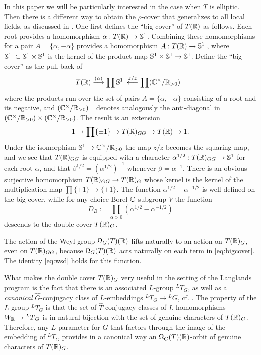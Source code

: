 \documentclass{article}
\theoremstyle{definition}
\numberwithin{equation}{section}
\renewcommand{\-}{\hyp{}}
\begin{document}
In this paper we will be particularly interested in the case when $T$ is elliptic. Then there is a different way to obtain the $\rho$-cover that generalizes to all local fields, as discussed in \cite{KalDC}. One first defines the ``big cover'' of $T(\mathbb{R})$ as follows. Each root provides a homomorphism $\alpha : T(\mathbb{R}) \to \mathbb{S}^1$. Combining these homomorphisms for a pair $A=\{\alpha,-\alpha\}$ provides a homomorphism $A : T(\mathbb{R}) \to \mathbb{S}^1_-$, where $\mathbb{S}^1_- \subset \mathbb{S}^1 \times \mathbb{S}^1$ is the kernel of the product map $\mathbb{S}^1 \times \mathbb{S}^1 \to \mathbb{S}^1$. Define the ``big cover'' as the pull-back of
\begin{equation} \label{eq:bigcover}
T(\mathbb{R}) \stackrel{(\alpha)}{\longrightarrow} \prod \mathbb{S}^1_- \stackrel{z/\bar z}{\longleftarrow} \prod(\mathbb{C}^\times/\mathbb{R}_{>0})_-
\end{equation}
where the products run over the set of pairs $A=\{\alpha,-\alpha\}$ consisting of a root and its negative, and $(\mathbb{C}^\times/\mathbb{R}_{>0})_-$ denotes analogously the anti-diagonal in $(\mathbb{C}^\times/\mathbb{R}_{>0}) \times (\mathbb{C}^\times/\mathbb{R}_{>0})$. The result is an extension
\[ 1 \to \prod\{\pm1\} \to T(\mathbb{R})_{GG} \to T(\mathbb{R}) \to 1. \]
Under the isomorphism $\mathbb{S}^1 \to \mathbb{C}^\times/\mathbb{R}_{>0}$ the map $z/\bar z$ becomes the squaring map, and we see that $T(\mathbb{R})_{GG}$ is equipped with a character $\alpha^{1/2} : T(\mathbb{R})_{GG} \to \mathbb{S}^1$ for each root $\alpha$, and that $\beta^{1/2}=(\alpha^{1/2})^{-1}$ whenever $\beta=\alpha^{-1}$. There is an obvious surjective homomorphism $T(\mathbb{R})_{GG} \to T(\mathbb{R})_G$ whose kernel is the kernel of the multiplication map $\prod\{\pm1\} \to \{\pm1\}$. The function $\alpha^{1/2}-\alpha^{-1/2}$ is well-defined on the big cover, while for any choice Borel $\mathbb{C}$-subgroup $V$ the function
\[ D_B := \prod_{\alpha>0}(\alpha^{1/2}-\alpha^{-1/2}) \]
descends to the double cover $T(\mathbb{R})_G$.

The action of the Weyl group $\Omega_G(T)(\mathbb{R})$ lifts naturally to an action on $T(\mathbb{R})_G$, even on $T(\mathbb{R})_{GG}$, because $\Omega_G(T)(\mathbb{R})$ acts naturally on each term in \eqref{eq:bigcover}. The identity \eqref{eq:wsd} holds for this function.

What makes the double cover $T(\mathbb{R})_G$ very useful in the setting of the Langlands program is the fact that there is an associated $L$\-group $^LT_G$, as well as a \emph{canonical} $\hat G$-conjugacy class of $L$\-embeddings $^LT_G \to {^LG}$, cf. \cite[\S4.1]{KalDC}. The property of the $L$\-group $^LT_G$ is that the set of $\hat T$-conjugacy classes of $L$\-homomorphisms $W_{\mathbb{R}} \to {^LT}_G$ is in natural bijection with the set of genuine characters of $T(\mathbb{R})_G$. Therefore, any $L$\-parameter for $G$ that factors through the image of the embedding of $^LT_G$ provides in a canonical way an $\Omega_G(T)(\mathbb{R})$-orbit of genuine characters of $T(\mathbb{R})_G$.
\end{document}
